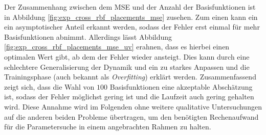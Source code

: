 Der Zusammenhang zwischen dem MSE und der Anzahl der Basisfunktionen ist in Abbildung \ref{fig:exp_cross_rbf_placements_mse} zusehen. Zum einen kann ein ein asymptotischer Anteil erkannt werden, sodass der Fehler erst einmal für mehr Basisfunktionen abnimmt. Allerdings lässt Abbildung \ref{fig:exp_cross_rbf_placements_mse_uv} erahnen, dass es hierbei einen optimalen Wert gibt, ab dem der Fehler wieder ansteigt. Dies kann durch eine schlechtere Generalisierung der Dynamik und ein zu starkes Anpassen und die Trainingsphase (auch bekannt als \textit{Overfitting}) erklärt werden. Zusammenfassend zeigt sich, dass die Wahl von $100$ Basisfunktionen eine akzeptable Abschätzung ist, sodass der Fehler möglichst gering ist und die Laufzeit auch gering gehalten wird. Diese Annahme wird im Folgenden ohne weitere qualitative Untersuchungen auf die anderen beiden Probleme übertragen, um den benötigten Rechenaufwand für die Parametersuche in einem angebrachten Rahmen zu halten.  

